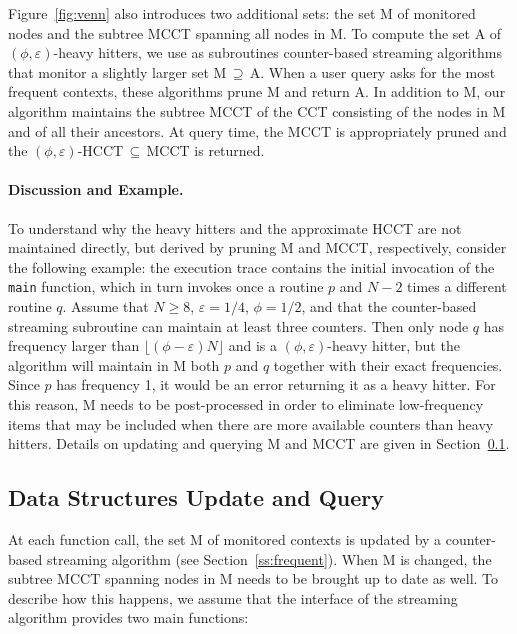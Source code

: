 \documentclass[preprint]{sigplanconf}
\begin{document}
\noindent Figure~\ref{fig:venn} also introduces two additional sets: the set M of monitored nodes and the subtree MCCT spanning all nodes in M. To compute the set A of $(\phi,\varepsilon)$-heavy hitters, we use as subroutines counter-based streaming algorithms that monitor a slightly larger set M$\,\supseteq\,$A. When a user query asks for the most frequent contexts, these algorithms prune M and return A. In addition to M, our algorithm maintains the subtree MCCT of the CCT consisting of the nodes in M and of all their ancestors. At query time, the MCCT is appropriately pruned and the $(\phi,\varepsilon)$-HCCT$\,\subseteq\,$MCCT is returned. 

\paragraph{Discussion and Example.} To understand why the heavy hitters and the approximate HCCT are not maintained directly, but derived by pruning M and MCCT, respectively, consider the following example: the execution trace contains the initial invocation of the {\tt main} function, which in turn invokes once a routine $p$ and $N-2$ times a different routine $q$. Assume that $N\ge 8$, $\varepsilon=1/4$, $\phi=1/2$, and that the counter-based streaming subroutine can maintain at least three counters. Then only node $q$ has frequency larger than $\lfloor(\phi-\varepsilon)N\rfloor$ and is a $(\phi,\varepsilon)$-heavy hitter, but the algorithm will maintain in M both $p$ and $q$ together with their exact frequencies. Since $p$ has frequency 1, it would be an error returning it as a heavy hitter. For this reason, M needs to be post-processed in order to eliminate low-frequency items that may be included when there are more available counters than heavy hitters. Details on updating and querying M and MCCT are given in Section~\ref{ss:update}.


\subsection{Data Structures Update and Query}
\label{ss:update}

At each function call, the set M of monitored contexts is updated by a counter-based streaming algorithm (see Section~\ref{ss:frequent}). When M is changed, the subtree MCCT spanning nodes in M needs to be brought up to date as well. To describe how this happens, we assume that the interface of the streaming algorithm provides two main functions:
\end{document}
